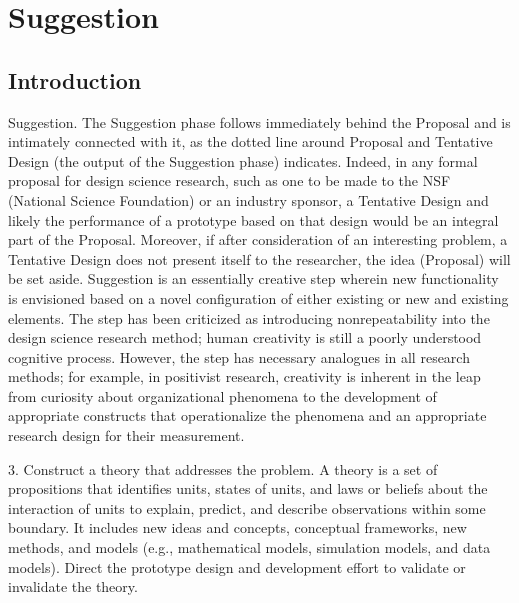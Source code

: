 
\chapter{Suggestion} %

\label{ChapterSuggestion} %


\section{Introduction}

Suggestion. The Suggestion phase follows immediately behind the Proposal and is intimately connected with it, as the dotted line around Proposal and Tentative Design (the output of the Suggestion phase) indicates. Indeed, in any formal proposal for design science research, such as one to be made to the NSF (National Science Foundation) or an industry sponsor, a Tentative Design and likely the performance of a prototype based on that design would be an integral part of the Proposal. Moreover, if after consideration of an interesting problem, a Tentative Design does not present itself to the researcher, the idea (Proposal) will be set aside. Suggestion is an essentially creative step wherein new functionality is envisioned based on a novel configuration of either existing or new and existing elements. The step has been criticized as introducing nonrepeatability into the design science research method; human creativity is still a poorly understood cognitive process. However, the step has necessary analogues in all research methods; for example, in positivist research, creativity is inherent in the leap from curiosity about organizational phenomena to the development of appropriate constructs that operationalize the phenomena and an appropriate research design for their measurement.
\cite{Vaishnavi2008}

3. Construct a theory that addresses the problem. A theory is a set of propositions that identifies units, states of units, and laws or beliefs about the interaction of units to explain, predict, and describe observations within some boundary. It includes new ideas and concepts, conceptual frameworks, new methods, and models (e.g., mathematical models, simulation models, and data models). Direct the prototype design and development effort to validate or invalidate the theory.
\cite{Vaishnavi2008}


